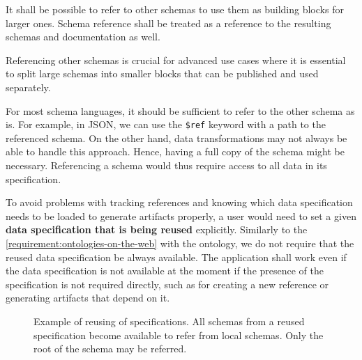 \begin{requirement}
  It shall be possible to refer to other schemas to use them as building blocks for larger ones. Schema reference shall be treated as a reference to the resulting schemas and documentation as well.
  \label{analysis/requirement/schema-reference}
\end{requirement}

Referencing other schemas is crucial for advanced use cases where it is essential to split large schemas into smaller blocks that can be published and used separately.

For most schema languages, it should be sufficient to refer to the other schema as is. For example, in JSON, we can use the \verb|$ref| keyword with a path to the referenced schema. On the other hand, data transformations may not always be able to handle this approach. Hence, having a full copy of the schema might be necessary. Referencing a schema would thus require access to all data in its specification.

To avoid problems with tracking references and knowing which data specification needs to be loaded to generate artifacts properly, a user would need to set a given \textbf{data specification that is being reused} explicitly. Similarly to the \autoref{requirement:ontologies-on-the-web} with the ontology, we do not require that the reused data specification be always available. The application shall work even if the data specification is not available at the moment if the presence of the specification is not required directly, such as for creating a new reference or generating artifacts that depend on it.

\begin{figure}[h!]\centering
  \caption{Example of reusing of specifications. All schemas from a reused specification become available to refer from local schemas. Only the root of the schema may be referred.}
\end{figure}